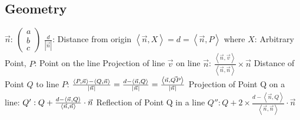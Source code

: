 \documentclass[12pt]{article}
\begin{document}
\subsection{Geometry}
\begin{math}
\vec{n}:\ \left ( \begin{matrix} a\\ b\\ c\end{matrix} \right )
\end{math}\newline\newline\newline
\begin{math}\frac{d}{\left |\vec{n}  \right |}\end{math}: Distance from origin\newline\newline
\begin{math}\left \langle \vec{n},X \right \rangle = d = \left \langle \vec{n},P \right \rangle\end{math} where $X$: Arbitrary Point, $P$: Point on the line\newline\newline
Projection of line $\vec{v}$ on line $\vec{n}$: \begin{math}\frac{\left \langle \vec{n}, \vec{v} \right \rangle}{\left \langle \vec{n},\vec{n} \right \rangle}\times \vec{n}\end{math}\newline\newline
Distance of Point $Q$ to line $P$:\newline
\begin{math}
\frac{\left \langle P,\vec{n} \right \rangle - \left \langle Q,\vec{n} \right \rangle}{\left | \vec{n} \right |}=\frac{d-\left \langle \vec{n}, Q \right \rangle}{\left | \vec{n} \right |}=
\frac{\left \langle \vec{n}, \vec{QP} \right \rangle}{\left | \vec{n} \right |}\newline\newline
\end{math}
Projection of Point Q on a line:\newline\newline
\begin{math}
Q':Q+\frac{d-\left \langle \vec{n},Q \right \rangle}{\left \langle \vec{n},\vec{n} \right \rangle}\cdot \vec{n}\newline\newline
\end{math}\newline\newline
Reflection of Point Q in a line\newline\newline
\begin{math}
Q'': Q+2\times\frac{d-\left \langle \vec{n},Q \right \rangle}{\left \langle \vec{n},\vec{n} \right \rangle}\cdot \vec{n}
\end{math}\newpage
\end{document}
